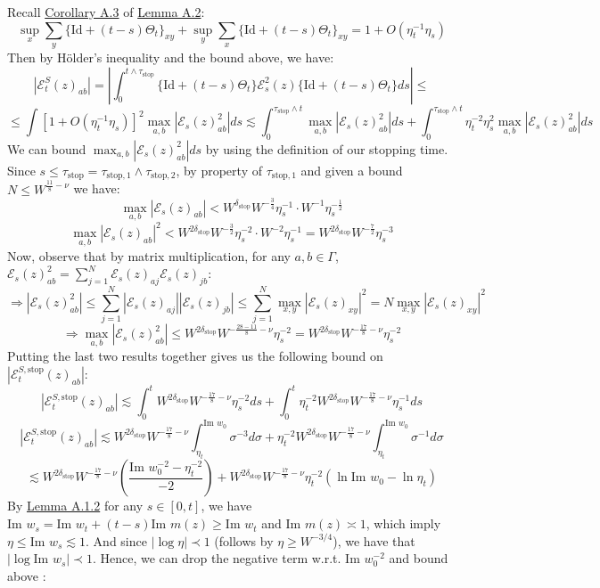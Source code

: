 \documentclass[11pt]{article}
\newcommand{\E}{\mathcal{E}}
\newcommand{\sto}{\text{stop}}
\newcommand{\im}{\text{Im }}
\begin{document}
Recall \hyperref[cor-a3]{Corollary A.3} of \hyperref[lemma-a2]{Lemma A.2}: $$\sup_x \sum_y \{\text{Id}+(t-s)\Theta_t\}_{xy}+\sup_y \sum_x \{\text{Id}+(t-s)\Theta_t\}_{xy} = 1+O(\eta_t^{-1}\eta_s)$$
Then by Hölder's inequality and the bound above, we have: $$|\E_t^{S}(z)_{ab}|=\left\vert\int_0^{t\wedge \tau_\sto} \{\text{Id} + (t-s)\Theta_t\}\E_s^2(z) \{\text{Id} + (t-s)\Theta_t\}ds\right\vert \leq$$
$$\leq \int \left[1+O(\eta_t^{-1}\eta_s)\right]^2 \max_{a, b}|\E_s(z)_{ab}^2|ds \lesssim \int_0^{\tau_\sto \wedge t} \max_{a, b}|\E_s(z)_{ab}^2|ds + \int_0^{\tau_\sto \wedge t}\eta_t^{-2}\eta_s^{2} \max_{a, b}|\E_s(z)^2_{ab}|ds$$
We can bound $\max_{a, b}|\E_s(z)_{ab}^2|ds$ by using the definition of our stopping time. Since $s\leq \tau_\sto = \tau_{\sto, 1}\wedge \tau_{\sto, 2}$, by property of $\tau_{\sto, 1}$ and given a bound $N\leq W^{\frac{11}{8}-\nu}$ we have: $$\max_{a, b}|\E_s(z)_{ab}|<W^{\delta_\sto} W^{-\frac{3}{4}} \eta_s^{-1}\cdot W^{-1}\eta_s^{-\frac{1}{2}}$$
$$\max_{a, b}|\E_s(z)_{ab}|^2<W^{2\delta_\sto} W^{-\frac{3}{2}} \eta_s^{-2}\cdot W^{-2}\eta_s^{-1}=W^{2\delta_{\sto}} W^{-\frac{7}{2}}\eta_s^{-3} $$
Now, observe that by matrix multiplication, for any $a, b\in \Gamma$,$\E_s(z)^2_{ab} = \sum_{j=1}^N \E_s(z)_{aj}\E_s(z)_{jb}$:
$$\Rightarrow |\E_s(z)_{ab}^2|\leq \sum_{j=1}^N |\E_s(z)_{aj}||\E_s(z)_{jb}|\leq \sum_{j=1}^N \max_{x,y}|\E_s(z)_{xy}|^2 = N\max_{x,y}|\E_s(z)_{xy}|^2$$
$$\Rightarrow \max_{a,b}|\E_s(z)^2_{ab}|\leq W^{2\delta_\sto}W^{-\frac{28-11}{8}-\nu}\eta_s^{-2} = W^{2\delta_\sto}W^{-\frac{17}{8}-\nu}\eta_s^{-2}$$
Putting the last two results together gives us the following bound on $|\E_t^{S, \mathrm{stop}}(z)_{ab}|$:
$$|\E_t^{S, \mathrm{stop}}(z)_{ab}|\lesssim \int_0^t W^{2\delta_\sto}W^{-\frac{17}{8}-\nu}\eta_s^{-2}ds + \int_0^t \eta_t^{-2}W^{2\delta_\sto}W^{-\frac{17}{8}-\nu}\eta_s^{-1}ds$$
\begin{equation*}
|\E_t^{S, \sto}(z)_{ab}|\lesssim W^{2\delta_\sto} W^{-\frac{17}{8}-\nu}\int_{\eta_t}^{\im w_0}\sigma^{-3}d\sigma + \eta_t^{-2} W^{2\delta_\sto} W^{-\frac{17}{8}-\nu}\int_{\eta_t}^{\im w_0}\sigma^{-1}d\sigma
\end{equation*}
\begin{equation*}
\lesssim W^{2\delta_\sto} W^{-\frac{17}{8}-\nu} \left(\frac{\im w_0^{-2}-\eta_t^{-2}}{-2}\right)+W^{2\delta_\sto}W^{-\frac{17}{8}-\nu}\eta_t^{-2}\left(\ln \im w_0-\ln \eta_t\right)
\end{equation*}
By \hyperref[lemma-a12]{Lemma A.1.2} for any $s\in [0, t]$, we have $\im w_s = \im w_t+(t-s)\im m(z)\geq \im w_t$
and \hyperref[2.1]{$\im m(z)\asymp 1$}, which imply $\eta\leq \im w_s\lesssim 1$. And since $|\log \eta|\prec 1$ (follows by $\eta\geq W^{-3/4}$), we have that $|\log \im w_s|\prec 1$. Hence, we can drop the negative term w.r.t. $\im w_0^{-2}$ and bound above :
\end{document}
